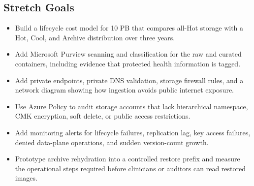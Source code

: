\subsection*{Stretch Goals}
\begin{itemize}
    \item Build a lifecycle cost model for 10 PB that compares all-Hot storage with a Hot, Cool, and Archive distribution over three years.
    \item Add Microsoft Purview scanning and classification for the raw and curated containers, including evidence that protected health information is tagged.
    \item Add private endpoints, private DNS validation, storage firewall rules, and a network diagram showing how ingestion avoids public internet exposure.
    \item Use Azure Policy to audit storage accounts that lack hierarchical namespace, CMK encryption, soft delete, or public access restrictions.
    \item Add monitoring alerts for lifecycle failures, replication lag, key access failures, denied data-plane operations, and sudden version-count growth.
    \item Prototype archive rehydration into a controlled restore prefix and measure the operational steps required before clinicians or auditors can read restored images.
\end{itemize}
